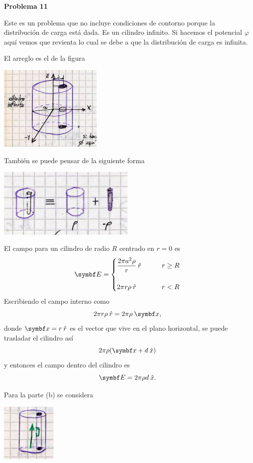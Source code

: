 \documentclass[10pt,oneside]{CBFT_book}
\begin{document}
\begin{ejemplo}{\bf Problema 11}

Este es un problema que no incluye condiciones de contorno porque la distribución de carga está dada.
Es un cilindro infinito.
Si hacemos el potencial $\varphi$ aquí vemos que revienta lo cual se debe a que la distribución de carga
es infinita.

El arreglo es el de la figura

\includegraphics[width=0.375\textwidth]{images/fig_ft1_problema_11a.jpg}

También se puede pensar de la siguiente forma

\includegraphics[width=0.5\textwidth]{images/fig_ft1_problema_11b.jpg}

El campo para un cilindro de radio $R$ centrado en $r=0$ es 
\[
	\vb{E}  = 
	\begin{cases} 
		\displaystyle \frac{2 \pi a^2 \rho }{r} \rver & \qquad r \geq R  \\
		\\
		2 \pi r \rho \rver & \qquad r < R
	\end{cases}
\]
Escribiendo el campo interno como 
\[
	2 \pi r \rho \rver = 2 \pi \rho \: \vb{x},
\]
donde $\vbx = r \rver $ es el vector que vive en el plano horizontal, se puede trasladar el cilindro
así 
\[
	2 \pi \rho ( \vb{x} + d \xver )
\]
y entonces el campo dentro del cilindro es
\[
	\vb{E} = 2 \pi \rho d \xver.
\]


Para la parte (b) se considera

\includegraphics[width=0.2\textwidth]{images/fig_ft1_problema_11c.jpg}


\end{ejemplo}
\end{document}

